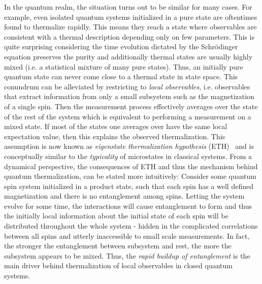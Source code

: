 In the quantum realm, the situation turns out to be similar for many cases. For example, even isolated quantum systems initialized in a pure state are oftentimes found to thermalize rapidly. This means they reach a state where observables are consistent with a thermal description depending only on few parameters. This is quite surprising considering the time evolution dictated by the Schrödinger equation preserves the purity and additionally thermal states are usually highly mixed (i.e. a statistical mixture of many pure states). 
Thus, an initially pure quantum state can never come close to a thermal state in state space. 
This conundrum can be alleviated by restricting to \emph{local observables}, i.e. observables that extract information from only a small subsystem such as the magnetization of a single spin. Then the measurement process effectively averages over the state of the rest of the system which is equivalent to performing a measurement on a mixed state. 
If most of the states one averages over have the same local expectation value, then this explains the observed thermalization. This assumption is now known as \emph{eigenstate thermalization hypothesis} (ETH)~\cite{deutschQuantumStatisticalMechanics1991,srednickiChaosQuantumThermalization1994, deutschEigenstateThermalizationHypothesis2018} and is conceptually similar to the \emph{typicality} of microstates in classical systems.
From a dynamical perspective, the consequences of ETH and thus the mechanism behind quantum thermalization, can be stated more intuitively: Consider some quantum spin system initialized in a product state, such that each spin has a well defined magnetization and there is no entanglement among spins. Letting the system evolve for some time, the interactions will cause entanglement to form and thus the initially local information about the initial state of each spin will be distributed throughout the whole system - hidden in the complicated correlations between all spins and utterly inaccessible to small scale measurements. In fact, 
the stronger the entanglement between subsystem and rest, the more the subsystem appears to be mixed.
Thus, the \emph{rapid buildup of entanglement} is the main driver behind thermalization of local observables in closed quantum systems.

